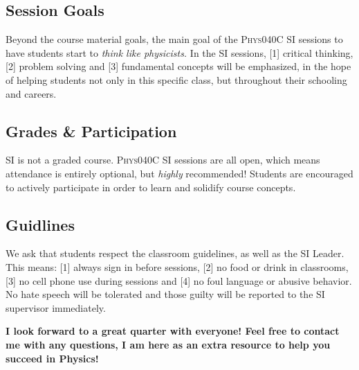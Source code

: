 \documentclass[11pt]{article}
\begin{document}
\subsection*{Session Goals}

Beyond the course material goals, the main goal of the \textsc{Phys040C} SI sessions to have students start to \emph{think like physicists.} In the SI sessions, [1] critical thinking, [2] problem solving and [3] fundamental concepts will be emphasized, in the hope of helping students not only in this specific class, but throughout their schooling and careers. 

\subsection*{Grades \& Participation}

SI is not a graded course. 
\textsc{Phys040C SI} sessions are all open, which means  attendance is entirely optional, but \emph{highly} recommended!
Students are encouraged to actively participate in order to learn and solidify course concepts.  


\subsection*{Guidlines}

We ask that students respect the classroom guidelines, as well as the SI Leader. 
This means: [1] always sign in before sessions, [2] no food or drink in classrooms, [3] no cell phone use during sessions and [4] no foul language or abusive behavior.
No hate speech will be tolerated and those guilty will be reported to the SI supervisor immediately. 

\begin{center}
	
{\bfseries I look forward to a great quarter with everyone! Feel free to contact me with any questions, I am here as an extra resource to help you succeed in Physics!}

\end{center}
\end{document}
